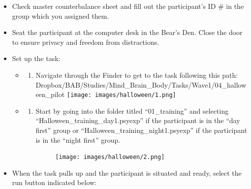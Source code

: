 \documentclass[
]{book}
\providecommand{\tightlist}{%
  \setlength{\itemsep}{0pt}\setlength{\parskip}{0pt}}
\begin{document}
\begin{itemize}
\item
  Check master counterbalance sheet and fill out the participant's ID \# in the group which you assigned them.
\item
  Seat the participant at the computer desk in the Bear's Den. Close the door to ensure privacy and freedom from distractions.
\item
  Set up the task:

  \begin{itemize}
  \item
    \begin{enumerate}
    \def\labelenumi{\alph{enumi}.}
    \tightlist
    \item
      Navigate through the Finder to get to the task following this path:
      Dropbox/BAB/Studies/Mind\_Brain\_Body/Tasks/Wave1/04\_halloween\_pilot
      \texttt{[image: images/halloween/1.png]}
    \end{enumerate}
  \item
    \begin{enumerate}
    \def\labelenumi{\alph{enumi}.}
    \setcounter{enumi}{1}
    \item
      Start by going into the folder titled ``01\_training'' and selecting ``Halloween\_training\_day1.psyexp'' if the participant is in the ``day first'' group or ``Halloween\_training\_night1.psyexp'' if the participant is in the ``night first'' group.

      \begin{figure}
      \centering
      \texttt{[image: images/halloween/2.png]}
      \caption{}
      \end{figure}
    \end{enumerate}
  \end{itemize}
\item
  When the task pulls up and the participant is situated and ready, select the run button indicated below:


\end{itemize}
\end{document}
